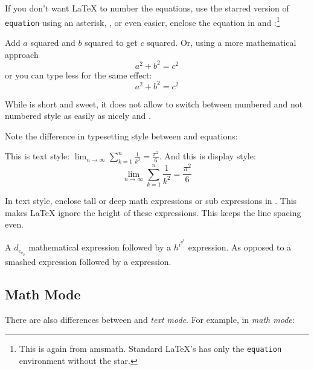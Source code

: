 If you don't want \LaTeX{} to number the equations, use the starred
version of \texttt{equation} using an asterisk, , or even easier, enclose the
equation in \ci{[} and \ci{]}:\footnote{
  This is again from \textsf{amsmath}. Standard \LaTeX{}'s has only the \texttt{equation} environment without the star.}
\begin{example}
Add $a$ squared and $b$ squared
to get $c$ squared. Or, using
a more mathematical approach
 \begin{equation*}
   a^2 + b^2 = c^2
 \end{equation*}
or you can type less for the
same effect:
 \[ a^2 + b^2 = c^2 \]
\end{example}
While \ci{[} is short and sweet, it does not allow to switch between numbered and not numbered style as easily as
nicely  and .

Note the difference in typesetting style between  and 
equations: 
\begin{example}
This is text style: 
$\lim_{n \to \infty} 
 \sum_{k=1}^n \frac{1}{k^2} 
 = \frac{\pi^2}{6}$.
And this is display style:
 \begin{equation}
  \lim_{n \to \infty} 
  \sum_{k=1}^n \frac{1}{k^2} 
  = \frac{\pi^2}{6}
 \end{equation}
\end{example}

In text style, enclose tall or deep math expressions or sub
expressions in . This makes \LaTeX{} ignore the height of
these expressions. This keeps the line spacing even.

\begin{example}
A $d_{e_{e_p}}$ mathematical
expression  followed by a
$h^{i^{g^h}}$ expression. As
opposed to a smashed 
 expression 
followed by a
 expression.
\end{example}

\subsection{Math Mode}

There are also differences between \emph{} and \emph{text mode}. For
example, in \emph{math mode}: 

